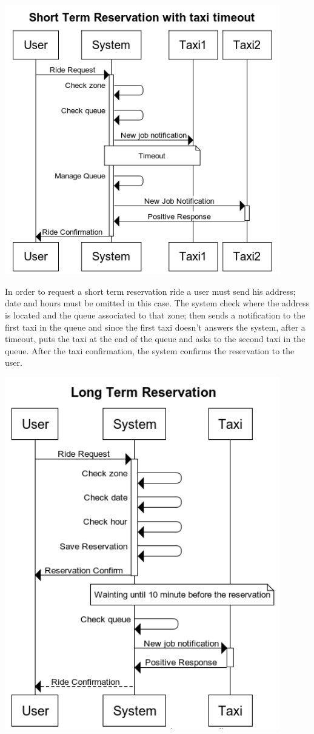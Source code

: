 	\begin{center}
		\includegraphics[width=0.90\textwidth]{./images/Short_Term_Reservation_with_taxi_timeout}
	\end{center}
	In order to request a short term reservation ride a user must send his address; date and hours must be omitted in this case. The system check where the address is located and the queue associated to that zone; then sends a notification to the first taxi in the queue and since the first taxi doesn't answers the system, after a timeout, puts the taxi at the end of the queue and asks to the second taxi in the queue. After the taxi confirmation, the system confirms the reservation to the user.
		\newpage
	\begin{center}
		\includegraphics[width=0.90\textwidth]{./images/Long_Term_Reservation}
	\end{center}

